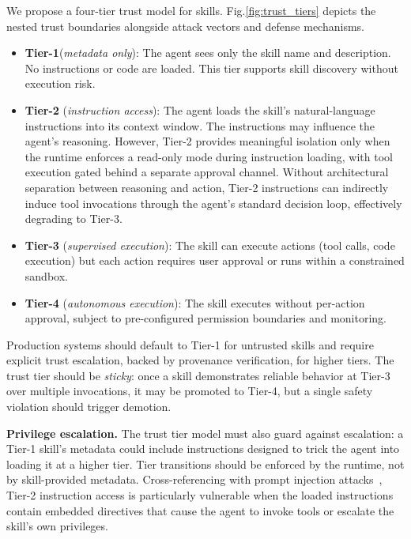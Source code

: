 \documentclass[conference, compsoc]{IEEEtran}
\theoremstyle{plain}
\newcommand{\para}[1]{\smallskip\noindent\textbf{#1.}}
\begin{document}
We propose a four-tier trust model for skills. Fig.\ref{fig:trust_tiers} depicts the nested trust boundaries alongside attack vectors and defense mechanisms.

\begin{itemize}[nosep,leftmargin=*]
  \item \textbf{Tier-1}(\textit{metadata only}): The agent sees only the skill name and description. No instructions or code are loaded. This tier supports skill discovery without execution risk.
  \item \textbf{Tier-2} (\textit{instruction access}): The agent loads the skill's natural-language instructions into its context window. The instructions may influence the agent's reasoning. However, Tier-2 provides meaningful isolation only when the runtime enforces a read-only mode during instruction loading, with tool execution gated behind a separate approval channel. Without architectural separation between reasoning and action, Tier-2 instructions can indirectly induce tool invocations through the agent's standard decision loop, effectively degrading to Tier-3.
  \item \textbf{Tier-3} (\textit{supervised execution}): The skill can execute actions (tool calls, code execution) but each action requires user approval or runs within a constrained sandbox.
  \item \textbf{Tier-4} (\textit{autonomous execution}): The skill executes without per-action approval, subject to pre-configured permission boundaries and monitoring.
\end{itemize}

Production systems should default to Tier-1 for untrusted skills and require explicit trust escalation, backed by provenance verification, for higher tiers. The trust tier should be \emph{sticky}: once a skill demonstrates reliable behavior at Tier-3 over multiple invocations, it may be promoted to Tier-4, but a single safety violation should trigger demotion.

\para{Privilege escalation} The trust tier model must also guard against escalation: a Tier-1 skill's metadata could include instructions designed to trick the agent into loading it at a higher tier. Tier transitions should be enforced by the runtime, not by skill-provided metadata. Cross-referencing with prompt injection attacks~\cite{greshake2023promptinjection}, Tier-2 instruction access is particularly vulnerable when the loaded instructions contain embedded directives that cause the agent to invoke tools or escalate the skill's own privileges.
\end{document}

